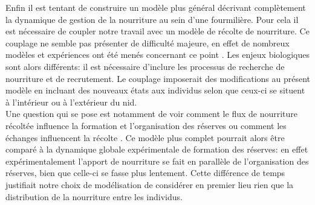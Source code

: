 Enfin il est tentant de construire un modèle plus général décrivant complètement la dynamique de gestion de la nourriture au sein d'une fourmilière. Pour cela il est nécessaire de coupler notre travail avec un modèle de récolte de nourriture. Ce couplage ne semble pas présenter de difficulté majeure, en effet de nombreux modèles et expériences ont été menés concernant ce point \citep{sumpter_collective_2010}. Les enjeux biologiques sont alors différents: il est nécessaire d'inclure les processus de recherche de nourriture et de recrutement. Le couplage imposerait des modifications au présent modèle en incluant des nouveaux états aux individus selon que ceux-ci se situent à l'intérieur ou à l'extérieur du nid.\\

Une question qui se pose est notamment de voir comment le flux de nourriture récoltée influence la formation et l'organisation des réserves ou comment les échanges influencent la récolte \citep{Provecho_2009}. Ce modèle plus complet pourrait alors être comparé à la dynamique globale expérimentale de formation des réserves: en effet expérimentalement l'apport de nourriture se fait en parallèle de l'organisation des réserves, bien que celle-ci se fasse plus lentement. Cette différence de temps justifiait notre choix de modélisation de considérer en premier lieu rien que la distribution de la nourriture entre les individus.\\


